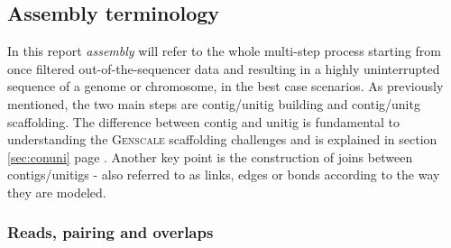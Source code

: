 \documentclass[12pt]{article}
\newcommand*{\fulleref}[1]{section \hyperref[{#1}] {\ref*{#1}} page {\pageref{#1}}}%
\begin{document}
\subsection{Assembly terminology}\label{sec:assterm}
In this report \textit{assembly} will refer to the whole multi-step process starting from once filtered out-of-the-sequencer data and resulting in a highly uninterrupted sequence of a genome or chromosome, in the best case scenarios. As previously mentioned, the two main steps are contig/unitig building and contig/unitg scaffolding. The difference between contig and unitig is fundamental to understanding the \textsc{Genscale} scaffolding challenges and is explained in \fulleref{sec:conuni}. Another key point is the construction of joins between contigs/unitigs - also referred to as links, edges or bonds according to the way they are modeled.

\subsubsection{Reads, pairing and overlaps} \label{sec:rpao}
\end{document}
